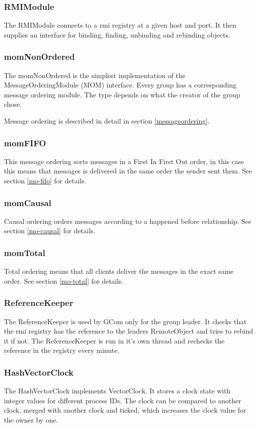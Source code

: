 \documentclass[english]{article}
\begin{document}
\subsubsection{RMIModule}
The RMIModule connects to a rmi registry at a given host and port. It then supplies an interface for binding, finding, unbinding and rebinding objects.

\subsubsection{momNonOrdered}
The momNonOrdered is the simplest implementation of the MessageOrderingModule (MOM) interface. Every group has a corresponding message ordering module. The type depends on what the creator of the group chose. 

Message ordering is described in detail in section \vref{messageordering}.

\subsubsection{momFIFO}
This message ordering sorts messages in a First In First Out order, in this case this means that messages is delivered in the same order the sender sent them. See section \vref{mo-fifo} for details.

\subsubsection{momCausal}
Causal ordering orders messages according to a happened before relationship. See section \vref{mo-causal} for details.

\subsubsection{momTotal}
Total ordering means that all clients deliver the messages in the exact same order. See section \vref{mo-total} for details.

\subsubsection{ReferenceKeeper}
The ReferenceKeeper is used by GCom only for the group leader. It checks that the rmi registry has the reference to the leaders RemoteObject and tries to rebind it if not. The ReferenceKeeper is run in it's own thread and rechecks the reference in the registry every minute.

\subsubsection{HashVectorClock}
The HashVectorClock implements VectorClock. It stores a clock state with integer values for different process IDs. The clock can be compared to another clock, merged with another clock and ticked, which increases the clock value for the owner by one.
\end{document}
